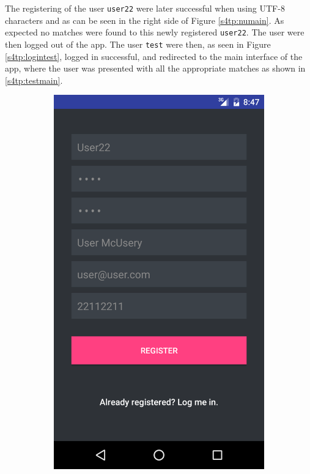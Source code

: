 The registering of the user \texttt{user22} were later successful when using UTF-8 characters and as can be seen in the right side of Figure \ref{s4tp:numain}. 
As expected no matches were found to this newly registered \texttt{user22}. 
The user were then logged out of the app.
The user \texttt{test} were then, as seen in Figure \ref{s4tp:logintest}, logged in successful, and redirected to the main interface of the app, where the user was presented with all the appropriate matches as shown in \ref{s4tp:testmain}.
\begin{figure}[ht!]
\centering
\begin{subfigure}[b]{0.24\textwidth}
        \includegraphics[width=\textwidth]{figures/s4test/newuser.png}

\end{subfigure}
\end{figure}
